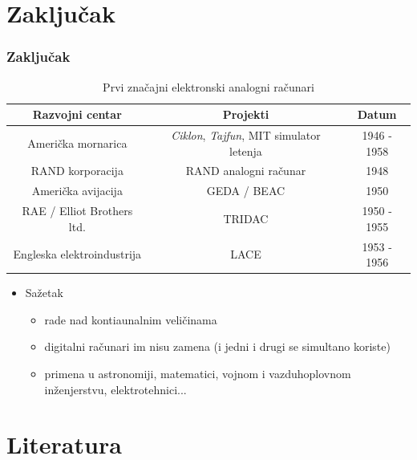 \documentclass[14pt]{beamer}
\begin{document}
\section{Zaključak}
\begin{frame}[fragile]\frametitle{Zaključak}
	\begin{scriptsize}
	\begin{table}
		\caption{Prvi značajni elektronski analogni računari}
		\begin{tabular}{| c | c | c |}
			\hline
			\rowcolor{lightpurple}
			\textbf{Razvojni centar} & \textbf{Projekti} & \textbf{Datum} \\
			\hline
			\rowcolor{lightpurple1}
			Američka mornarica & \emph{Ciklon}, \emph{Tajfun}, MIT simulator letenja & 1946 - 1958 \\
			\rowcolor{lightpurple2}
			RAND korporacija & RAND analogni računar & 1948 \\
			\rowcolor{lightpurple1}
			Američka avijacija & GEDA / BEAC & 1950 \\
			\rowcolor{lightpurple2}
			RAE / Elliot Brothers ltd. &TRIDAC & 1950 - 1955 \\
			\rowcolor{lightpurple1}
			Engleska elektroindustrija & LACE & 1953 - 1956 \\ 
			\hline
		\end{tabular}
	\end{table}
	\end{scriptsize}

	\begin{itemize}
		\item Sažetak
		\begin{itemize}
			\item rade nad kontiaunalnim veličinama
			\item digitalni računari im nisu zamena (i jedni i drugi se simultano koriste)
			\item primena u astronomiji, matematici, vojnom i vazduhoplovnom inženjerstvu, elektrotehnici...
		\end{itemize}
	\end{itemize}
	
\end{frame}

\section{Literatura}
\end{document}
